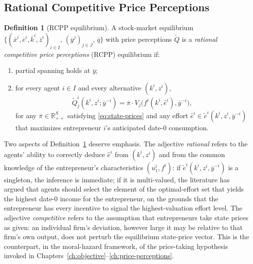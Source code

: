\documentclass[11pt,a4paper,oneside]{book}
\def\R{\mathbb{R}}
\theoremstyle{plain}
\theoremstyle{definition}
\newtheorem{definition}[theorem]{Definition}
\theoremstyle{remark}
\numberwithin{equation}{chapter}
\begin{document}
\subsection{Rational Competitive Price Perceptions}

\begin{definition}[RCPP equilibrium]\label{def:RCPP}
A stock-market equilibrium $\bigl\{ (\overline{x}^i, \overline{e}^i, \overline{k}^i, \overline{z}^i)_{i \in I}, \, (\overline{y}^j)_{j \in J}, \, \overline{q} \bigr\}$ with price perceptions $\widetilde{Q}$ is a \emph{rational competitive price perceptions} (RCPP) equilibrium if:
\begin{enumerate}
  \item[(i)] partial spanning holds at $\overline{y}$;
  \item[(ii)] for every agent $i \in I$ and every alternative $(k^i, z^i)$,
  \begin{equation}\label{eq:RCPP-perception}
    \widetilde{Q}^i_j(k^i, z^i; \overline{y}^{-i})
    = \overline{\pi} \cdot V_j\bigl( f^i(k^i, \widehat{e}^i), \overline{y}^{-i} \bigr),
  \end{equation}
  for any $\overline{\pi} \in \R_{++}^S$ satisfying \eqref{eq:state-prices} and any effort $\widehat{e}^i \in \widetilde{e}^i(k^i, z^i, \overline{y}^{-i})$ that maximizes entrepreneur $i$'s anticipated date-$0$ consumption.
\end{enumerate}
\end{definition}

Two aspects of Definition~\ref{def:RCPP} deserve emphasis.
The adjective \emph{rational} refers to the agents' ability to correctly deduce $\widehat{e}^i$ from $(k^i, z^i)$ and from the common knowledge of the entrepreneur's characteristics $(u^i_1, f^i)$: if $\widetilde{e}^i(k^i, z^i, \overline{y}^{-i})$ is a singleton, the inference is immediate; if it is multi-valued, the literature has argued that agents should select the element of the optimal-effort set that yields the highest date-$0$ income for the entrepreneur, on the grounds that the entrepreneur has every incentive to signal the highest-valuation effort level.
The adjective \emph{competitive} refers to the assumption that entrepreneurs take state prices as given: an individual firm's deviation, however large it may be relative to that firm's own output, does not perturb the equilibrium state-price vector.
This is the counterpart, in the moral-hazard framework, of the price-taking hypothesis invoked in Chapters~\ref{ch:objective}--\ref{ch:price-perceptions}.
\end{document}
